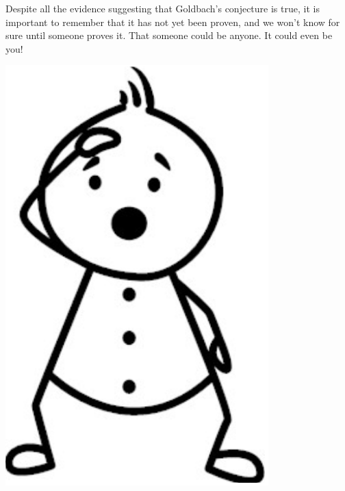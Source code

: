 \documentclass{article}
\begin{document}
Despite all the evidence suggesting that Goldbach’s conjecture is true, it is important to remember that it has not yet been proven, and we won’t know for sure until someone proves it. That someone could be anyone. It could even be you!
\begin{center}
    \includegraphics[width=4in,scale=0.3]{images/stick_figure1.png}
\end{center}
\end{document}
